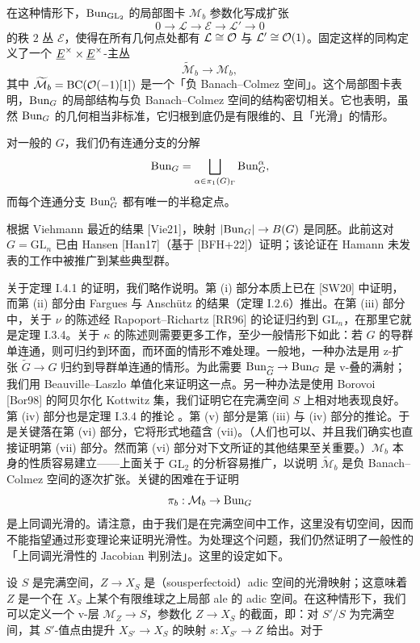 在这种情形下，$\mathrm{Bun}_{\mathrm{GL}_2}$ 的局部图卡 $\mathcal{M}_b$ 参数化写成扩张
\[
  0\to\mathcal{L}\to\mathcal{E}\to\mathcal{L}'\to 0
\]
的秩 $2$ 丛 $\mathcal{E}$，使得在所有几何点处都有 $\mathcal{L}\cong\mathcal{O}$ 与 $\mathcal{L}'\cong\mathcal{O}(1)$。固定这样的同构定义了一个 $\underline{E}^\times\times\underline{E}^\times$-主丛
\[
  \widetilde{\mathcal{M}}_b\to\mathcal{M}_b,
\]
其中 $\widetilde{\mathcal{M}}_b=\mathrm{BC}(\mathcal{O}(-1)[1])$ 是一个「负 Banach–Colmez 空间」。这个局部图卡表明，$\mathrm{Bun}_G$ 的局部结构与负 Banach–Colmez 空间的结构密切相关。它也表明，虽然 $\mathrm{Bun}_G$ 的几何相当非标准，它归根到底仍是有限维的、且「光滑」的情形。

对一般的 $G$，我们仍有连通分支的分解
\[
  \mathrm{Bun}_G = \bigsqcup_{\alpha\in\pi_1(G)_\Gamma}\mathrm{Bun}_G^\alpha,
\]
而每个连通分支 $\mathrm{Bun}_G^\alpha$ 都有唯一的半稳定点。

根据 Viehmann 最近的结果 [Vie21]，映射 $|\mathrm{Bun}_G|\to B(G)$ 是同胚。此前这对 $G=\mathrm{GL}_n$ 已由 Hansen [Han17]（基于 [BFH+22]）证明；该论证在 Hamann 未发表的工作中被推广到某些典型群。

关于定理 I.4.1 的证明，我们略作说明。第 (i) 部分本质上已在 [SW20] 中证明，而第 (ii) 部分由 Fargues 与 Anschütz 的结果（定理 I.2.6）推出。在第 (iii) 部分中，关于 $\nu$ 的陈述经 Rapoport–Richartz [RR96] 的论证归约到 $\mathrm{GL}_n$，在那里它就是定理 I.3.4。关于 $\kappa$ 的陈述则需要更多工作，至少一般情形下如此：若 $G$ 的导群单连通，则可归约到环面，而环面的情形不难处理。一般地，一种办法是用 z-扩张 $\widetilde{G}\to G$ 归约到导群单连通的情形。为此需要 $\mathrm{Bun}_{\widetilde{G}}\to\mathrm{Bun}_G$ 是 v-叠的满射；我们用 Beauville–Laszlo 单值化来证明这一点。另一种办法是使用 Borovoi [Bor98] 的阿贝尔化 Kottwitz 集，我们证明它在完满空间 $S$ 上相对地表现良好。第 (iv) 部分也是定理 I.3.4 的推论
。第 (v) 部分是第 (iii) 与 (iv) 部分的推论。于是关键落在第 (vi) 部分，它将形式地蕴含 (vii)。（人们也可以、并且我们确实也直接证明第 (vii) 部分。然而第 (vi) 部分对下文所证的其他结果至关重要。）$\mathcal{M}_b$ 本身的性质容易建立——上面关于 $\mathrm{GL}_2$ 的分析容易推广，以说明 $\widetilde{\mathcal{M}}_b$ 是负 Banach–Colmez 空间的逐次扩张。关键的困难在于证明
\[
  \pi_b : \mathcal{M}_b\to\mathrm{Bun}_G
\]
是上同调光滑的。请注意，由于我们是在完满空间中工作，这里没有切空间，因而不能指望通过形变理论来证明光滑性。为处理这个问题，我们仍然证明了一般性的「上同调光滑性的 Jacobian 判别法」。这里的设定如下。

设 $S$ 是完满空间，$Z\to X_S$ 是（sousperfectoid）adic 空间的光滑映射；这意味着 $Z$ 是一个在 $X_S$ 上某个有限维球之上局部 ale 的 adic 空间。在这种情形下，我们可以定义一个 v-层 $\mathcal{M}_Z\to S$，参数化 $Z\to X_S$ 的截面，即：对 $S'/S$ 为完满空间，其 $S'$-值点由提升 $X_{S'}\to X_S$ 的映射 $s: X_{S'}\to Z$ 给出。对于
